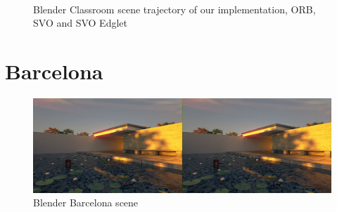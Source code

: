 \documentclass[11pt,a4paper,titlepage,oneside]{report}
\begin{document}
\begin{figure}[H]
  \centering
  \\
  \caption{Blender Classroom scene trajectory of our implementation, ORB, SVO and SVO Edglet}\label{fig:blender_classroom_comp}
\end{figure}

\section{Barcelona}

\begin{figure}[H]
  \includegraphics[width=1.0\textwidth]{img/blender_barcelona_scene.png}
  \caption{Blender Barcelona scene}\label{fig:blender_barcelona_scene}
\end{figure}
\end{document}
